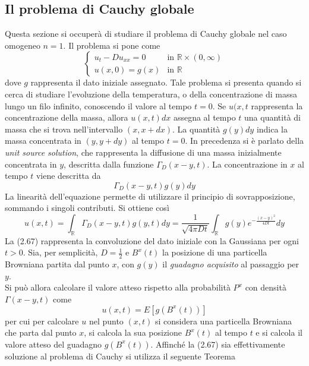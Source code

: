 \documentclass[a4paper,12pt, draft]{article}
\theoremstyle{break}
\numberwithin{equation}{section}
\begin{document}
\subsection{Il problema di Cauchy globale}
Questa sezione si occuperà di studiare il problema di Cauchy globale nel caso omogeneo \(n=1\).
Il problema si pone come 
\begin{equation}
  \begin{cases}
  u_t -Du_{xx} = 0 & \mbox{in } \mathbb{R} \times (0, \infty) \\
  u(x, 0) = g(x) & \mbox{in } \mathbb{R}
 \end{cases}
\end{equation}
dove \(g\) rappresenta il dato iniziale assegnato. Tale problema si presenta quando si cerca di studiare l'evoluzione della temperatura, o della concentrazione di massa lungo un filo infinito, conoscendo il valore al tempo \(t = 0\).
Se \(u(x,t\) rappresenta la concentrazione della massa, allora \(u(x,t)dx\) assegna al tempo \(t\) una quantità di massa che si trova nell'intervallo \((x, x+dx)\).
La quantità \(g(y)dy\) indica la massa concentrata in \((y, y+dy)\) al tempo \(t=0\). In precedenza si è parlato della \emph{unit source solution}, che rappresenta la diffusione di una massa inizialmente concentrata in \(y\), descritta dalla funzione \(\Gamma_D(x-y,t)\).
La concentrazione in \(x\) al tempo \(t\) viene descritta da 
\[
  \Gamma_D(x-y, t)g(y)dy
\]
La linearità dell'equazione permette di utilizzare il principio di sovrapposizione, sommando i singoli contributi. Si ottiene così
\begin{equation}
  u(x,t)= \int_{\mathbb{R}} \Gamma_D(x-y,t)g(y,t)dy = \frac{1}{\sqrt{4\pi Dt}}\int_{\mathbb{R}}g(y)e^{-\frac{(x-y)^2}{4Dt}}dy
\end{equation}
La (2.67) rappresenta la convoluzione del dato iniziale con la Gaussiana per ogni \(t>0\). Sia, per semplicità, \(D=\frac{1}{2}\) e \(B^x(t)\) la posizione di una particella Browniana partita dal punto \(x\), con \(g(y)\) il \emph{guadagno acquisito} al passaggio per \(y\).\\
Si può allora calcolare il valore atteso rispetto alla probabilità \(P^x\) con densità \(\Gamma(x-y,t)\) come 
\[
  u(x,t) = E[g(B^x(t))]
\]
per cui per calcolare \(u\) nel punto \((x,t)\) si considera una particella Browniana che parta dal punto \(x\), si calcola la sua posizione \(B^x(t)\) al tempo \(t\) e si calcola il valore atteso del guadagno \(g(B^x(t))\).
Affinché la (2.67) sia effettivamente soluzione al problema di Cauchy si utilizza il seguente Teorema
\end{document}
